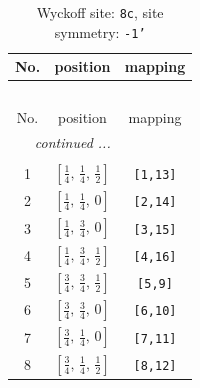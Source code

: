 \documentclass[fleqn,8pt]{jsarticle}
\begin{document}
\renewcommand{\arraystretch}{1.2}
\begin{longtable}{ccc}
\caption{Wyckoff site: {\tt 8c}, site symmetry: {\tt -1'}}
 \\
 \hline \hline
No. & position & mapping \\ \hline \endfirsthead

\multicolumn{2}{l}{\tablename\ \thetable{}} \\
 \hline \hline
No. & position & mapping \\ \hline \endhead

 \hline \hline
\multicolumn{2}{r}{\footnotesize\it continued ...} \\ \endfoot

 \hline \hline
\multicolumn{2}{r}{} \\ \endlastfoot

1 & $\left[ \frac{1}{4},\, \frac{1}{4},\, \frac{1}{2} \right]$ & {\tt [1,13]} \\ \hline
2 & $\left[ \frac{1}{4},\, \frac{1}{4},\, 0 \right]$ & {\tt [2,14]} \\ \hline
3 & $\left[ \frac{1}{4},\, \frac{3}{4},\, 0 \right]$ & {\tt [3,15]} \\ \hline
4 & $\left[ \frac{1}{4},\, \frac{3}{4},\, \frac{1}{2} \right]$ & {\tt [4,16]} \\ \hline
5 & $\left[ \frac{3}{4},\, \frac{3}{4},\, \frac{1}{2} \right]$ & {\tt [5,9]} \\ \hline
6 & $\left[ \frac{3}{4},\, \frac{3}{4},\, 0 \right]$ & {\tt [6,10]} \\ \hline
7 & $\left[ \frac{3}{4},\, \frac{1}{4},\, 0 \right]$ & {\tt [7,11]} \\ \hline
8 & $\left[ \frac{3}{4},\, \frac{1}{4},\, \frac{1}{2} \right]$ & {\tt [8,12]} \\
\end{longtable}
\renewcommand{\arraystretch}{1.2}
\end{document}
